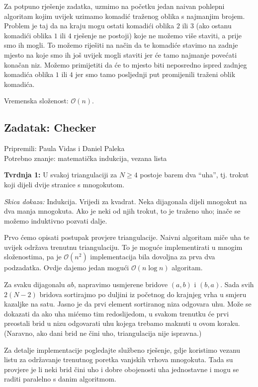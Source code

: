 \documentclass[a4paper]{article}
\begin{document}
Za potpuno rješenje zadatka, uzmimo na početku jedan naivan pohlepni algoritam
kojim uvijek uzimamo komadić traženog oblika s najmanjim brojem. Problem je taj
da na kraju mogu ostati komadići oblika $2$ ili $3$ (ako
ostanu komadići oblika $1$ ili $4$ rješenje ne postoji) koje ne možemo više
staviti, a prije smo ih mogli. To možemo riješiti na način da te komadiće
stavimo na zadnje mjesto na koje smo ih još uvijek mogli staviti jer će tamo
najmanje povećati konačan niz. Možemo primijetiti da će to mjesto biti
neposredno ispred zadnjeg komadića oblika $1$ ili $4$ jer smo tamo posljednji
put promijenili traženi oblik komadića.

Vremenska složenost: $\mathcal{O}(n)$.

\subsection*{Zadatak: Checker}
\textsf{Pripremili: Paula Vidas i Daniel Paleka}\\
\textsf{Potrebno znanje: matematička indukcija, vezana lista}

\textbf{Tvrdnja 1: } \; U svakoj triangulaciji za $N \ge 4$ postoje barem dva
``uha'', tj. trokut koji dijeli dvije stranice s mnogokutom.

\emph{Skica dokaza: } \; Indukcija. Vrijedi za kvadrat.  Neka dijagonala dijeli
mnogokut na dva manja mnogokuta. Ako je neki od njih trokut, to je traženo uho;
inače se možemo induktivno pozvati dalje.

Prvo ćemo opisati postupak provjere triangulacije.  Naivni algoritam miče uha
te uvijek održava trenutnu triangulaciju. To je moguće implementirati u mnogim
složenostima, pa je $\mathcal{O}(n^2)$ implementacija bila dovoljna za prva dva
podzadatka.  Ovdje dajemo jedan mogući $\mathcal{O}(n \log n)$ algoritam.

Za svaku dijagonalu $ab$, napravimo usmjerene bridove $(a, b)$ i $(b, a)$. Sada
svih $2(N-2)$ bridova sortirajmo po duljini iz početnog do krajnjeg vrha u
smjeru kazaljke na satu.  Jasno je da prvi element sortiranog niza odgovara
uhu. Može se dokazati da ako uha mićemo tim redoslijedom, u svakom trenutku će
prvi preostali brid u nizu odgovarati uhu kojega trebamo maknuti u ovom koraku.
(Naravno, ako dani brid ne čini uho, triangulacija nije ispravna.)

Za detalje implementacije pogledajte službeno rješenje, gdje koristimo vezanu
listu za održavanje trenutnog poretka vanjskih vrhova mnogokuta. Tada su
provjere je li neki brid čini uho i dobre obojenosti uha jednostavne i mogu se
raditi paralelno s danim algoritmom.
\end{document}
